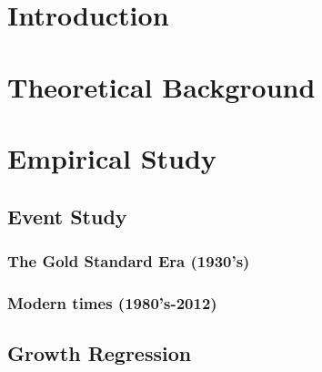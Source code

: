 \documentclass[12pt]{article} %
\begin{document}

\tableofcontents

\newpage 

\section{Introduction} 


\section{Theoretical Background}


\section{Empirical Study} 

\subsection{Event Study}

\subsubsection{The Gold Standard Era (1930's)}

\subsubsection{Modern times (1980's-2012)}

\subsection{Growth Regression}
\end{document}
